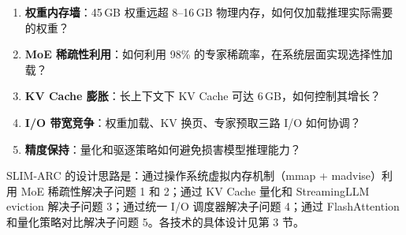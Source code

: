 \begin{enumerate}
    \item \textbf{权重内存墙}：45\,GB 权重远超 8--16\,GB 物理内存，如何仅加载推理实际需要的权重？
    \item \textbf{MoE 稀疏性利用}：如何利用 98\% 的专家稀疏率，在系统层面实现选择性加载？
    \item \textbf{KV Cache 膨胀}：长上下文下 KV Cache 可达 6\,GB，如何控制其增长？
    \item \textbf{I/O 带宽竞争}：权重加载、KV 换页、专家预取三路 I/O 如何协调？
    \item \textbf{精度保持}：量化和驱逐策略如何避免损害模型推理能力？
\end{enumerate}

SLIM-ARC 的设计思路是：通过操作系统虚拟内存机制（mmap + madvise）利用 MoE 稀疏性解决子问题 1 和 2；通过 KV Cache 量化和 StreamingLLM eviction 解决子问题 3；通过统一 I/O 调度器解决子问题 4；通过 FlashAttention 和量化策略对比解决子问题 5。各技术的具体设计见第 3 节。
